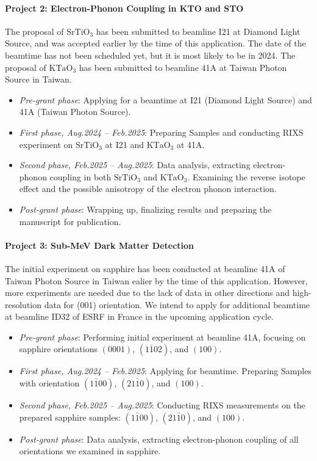 \documentclass[11pt]{article}
\begin{document}
\paragraph{Project 2: Electron-Phonon Coupling in KTO and STO}
The proposal of $\mathrm{SrTiO_{3}}$ has been submitted to beamline I21 at Diamond Light Source, and was accepted earlier by the time of this application. The date of the beamtime has not been scheduled yet, but it is most likely to be in 2024. The proposal of $\mathrm{KTaO_{3}}$ has been submitted to beamline 41A at Taiwan Photon Source in Taiwan. 
\begin{itemize}
  \item \textit{Pre-grant phase}: Applying for a beamtime at I21 (Diamond Light Source) and 41A (Taiwan Photon Source).
  \item \textit{First phase, Aug.2024 -- Feb.2025}: Preparing Samples and conducting RIXS experiment on $\mathrm{SrTiO_{3}}$ at I21 and $\mathrm{KTaO_{3}}$ at 41A. 
  \item \textit{Second phase, Feb.2025 -- Aug.2025}: Data analysis, extracting electron-phonon coupling in both $\mathrm{SrTiO_{3}}$ and $\mathrm{KTaO_{3}}$. Examining the reverse isotope effect and the possible anisotropy of the electron phonon interaction.
  \item \textit{Post-grant phase}:  Wrapping up,  finalizing results and preparing the manuscript for publication.
\end{itemize}

\paragraph{Project 3: Sub-MeV Dark Matter Detection}
The initial experiment on sapphire has been conducted at beamline 41A of Taiwan Photon Source in Taiwan ealier by the time of this application. However, more experiments are needed due to the lack of data in other directions and high-resolution data for (001) orientation. We intend to apply for additional beamtime at beamline ID32 of ESRF in France in the upcoming application cycle.
\begin{itemize}
  \item \textit{Pre-grant phase}: Performing initial experiment at beamline 41A, focusing on sapphire orientations $(0001)$, $(1\bar{1}02)$, and $(100)$. 
  \item \textit{First phase, Aug.2024 -- Feb.2025}: Applying for beamtime. Preparing Samples with orientation $(1\bar{1}00)$, $(21\bar{1}0)$, and $(100)$. 
  \item \textit{Second phase, Feb.2025 -- Aug.2025}: Conducting RIXS measurements on the prepared sapphire samples: $(1\bar{1}00)$, $(21\bar{1}0)$, and $(100)$. 
  \item \textit{Post-grant phase}: Data analysis, extracting electron-phonon coupling of all orientations we examined in sapphire.
\end{itemize}
\end{document}
